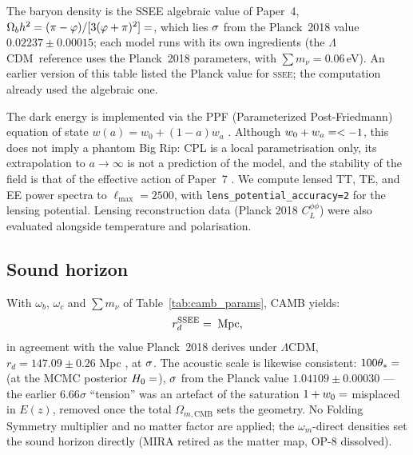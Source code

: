 \documentclass[12pt,a4paper]{article}
\newcommand{\SSEE}{\ifmmode\mathrm{SSEE}\else\textsc{ssee}\fi}
\newcommand{\LCDM}{\ifmmode\Lambda\mathrm{CDM}\else$\Lambda$CDM\fi}
\begin{document}
The baryon density is the SSEE algebraic value of Paper~4,
$\Omega_b h^2 = (\pi-\varphi)/[3(\varphi+\pi)^2] = \val{OMEGA_B_H2_d6}$, which lies
$\val{wb_planck_sig}\sigma$ from the Planck~2018 value $0.02237\pm0.00015$; each model
runs with its own ingredients (the \LCDM\ reference uses the Planck~2018 parameters,
with $\sum m_\nu=0.06$\,eV). An earlier version of this table listed the Planck value
for \SSEE; the computation already used the algebraic one.

The dark energy is implemented via the PPF (Parameterized Post-Friedmann)
equation of state $w(a)=w_0+(1-a)w_a$ \citep{Chevallier2001,Linder2003,Fang2008}.
Although $w_0+w_a=\val{w0_mas_wa}<-1$, this does not imply a phantom Big Rip:
CPL is a local parametrisation only, its extrapolation to $a\to\infty$ is not a
prediction of the model, and the stability of the field is that of the effective
action of Paper~7 \citep{AlmeidaSSEE2026a}.
We compute lensed TT, TE, and EE power spectra to $\ell_{\max}=2500$,
with \texttt{lens\_potential\_accuracy=2} for the lensing potential.
Lensing reconstruction data (Planck 2018 $C_L^{\phi\phi}$) were also evaluated
alongside temperature and polarisation.

\subsection{Sound horizon}

With $\omega_b$, $\omega_c$ and $\sum m_\nu$ of Table~\ref{tab:camb_params}, CAMB yields:
\begin{equation}
r_d^{\mathrm{SSEE}} = \val{p2_lyaB_rd} \;\mathrm{Mpc},
\end{equation}
in agreement with the value Planck~2018 derives under \LCDM,
$r_d=147.09\pm0.26$ Mpc \citep{Planck2018}, at $\val{p3_rd_sig_post}\sigma$.
The acoustic scale is likewise consistent: $100\theta_*=\val{p3_th100_post}$ (at the MCMC
posterior $H_0=\val{h0_p2}$), $\val{p3_th_sig_post}\sigma$ from the Planck value
$1.04109\pm0.00030$ --- the earlier $6.66\sigma$ ``tension'' was an artefact of
the saturation $1+w_0=\val{S_M_d6}$ misplaced in $E(z)$, removed once the total
$\Omega_{m,\mathrm{CMB}}$ sets the geometry.
No Folding Symmetry multiplier and no matter factor are applied; the
$\omega_m$-direct densities set the sound horizon directly (MIRA retired as the
matter map, OP-8 dissolved).
\end{document}
